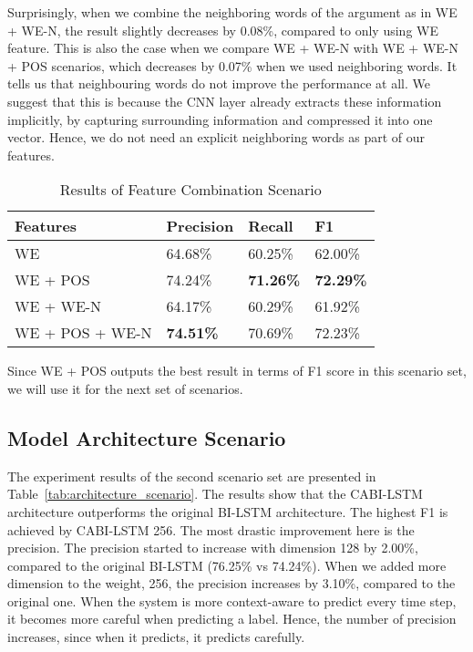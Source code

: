 Surprisingly, when we combine the neighboring words of the argument as in WE + WE-N, the result slightly decreases by 0.08\%, compared to only using WE feature. This is also the case when we compare WE + WE-N with WE + WE-N + POS scenarios, which decreases by 0.07\% when we used neighboring words. It tells us that neighbouring words do not improve the performance at all. We suggest that this is because the CNN layer already extracts these information implicitly, by capturing surrounding information and compressed it into one vector. Hence, we do not need an explicit neighboring words as part of our features. 

\begin{table}
	\caption{Results of Feature Combination Scenario}
	\label{tab:feature_scenario}
	\begin{tabular}{llll}
		\toprule
		Features		&Precision	&Recall		&F1			\\
		\midrule
		WE				&	64.68\%				&	60.25\%				&	62.00\%	\\
		WE + POS		&	74.24\%				&	\textbf{71.26\%}	&	\textbf{72.29\%}	\\
		WE + WE-N		&	64.17\%				&	60.29\%				&	61.92\%	\\
		WE + POS + WE-N	&	\textbf{74.51\%}	&	70.69\%				&	72.23\%	\\
		\bottomrule
	\end{tabular}
\end{table}

Since WE + POS outputs the best result in terms of F1 score in this scenario set, we will use it for the next set of scenarios.

\subsection{Model Architecture Scenario}
The experiment results of the second scenario set are presented in Table~\ref{tab:architecture_scenario}. The results show that the CABI-LSTM architecture outperforms the original BI-LSTM architecture. The highest F1 is achieved by CABI-LSTM 256. The most drastic improvement here is the precision. The precision started to increase with dimension 128 by 2.00\%, compared to the original BI-LSTM (76.25\% vs 74.24\%). When we added more dimension to the weight, 256, the precision increases by 3.10\%, compared to the original one. When the system is more context-aware to predict every time step, it becomes more careful when predicting a label. Hence, the number of precision increases, since when it predicts, it predicts carefully. 


